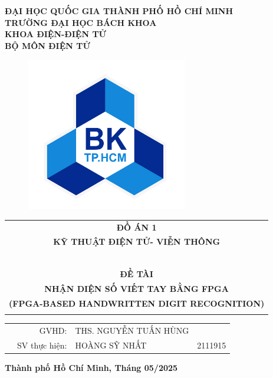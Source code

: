\documentclass[a4paper]{article}
\numberwithin{figure}{section}
\begin{document}
\large
\begin{titlepage}
\begin{center}
\textbf{\large ĐẠI HỌC QUỐC GIA THÀNH PHỐ HỒ CHÍ MINH} \\
\textbf{\large TRƯỜNG ĐẠI HỌC BÁCH KHOA} \\
\textbf{\large KHOA ĐIỆN-ĐIỆN TỬ} \\
\textbf{\large BỘ MÔN ĐIỆN TỬ} \\
\end{center}
\begin{figure}[h!]
\begin{center}
\includegraphics[width=7cm]{Images/hcmut.png}
\end{center}
\end{figure}

\vspace{1cm}
\begin{center}
\begin{tabular}{c}
{\textbf{{\Large ĐỒ ÁN 1}}}\\
{\textbf{{\Large KỸ THUẬT ĐIỆN TỬ- VIỄN THÔNG}}}\\
~~\\
\hline
\\
\textbf{\large ĐỀ TÀI} \\
\textbf{\LARGE NHẬN DIỆN SỐ VIẾT TAY BẰNG FPGA} \\
\textbf{\large (FPGA-BASED HANDWRITTEN DIGIT RECOGNITION)} \\
\\
\hline
\end{tabular}
\end{center}

\vspace{1cm}

\begin{table}[h]
\begin{tabular}{rrlr}
\hspace{5 cm} & \large GVHD: & \large THS. NGUYỄN TUẤN HÙNG\\

& \large SV thực hiện: &\large HOÀNG SỸ NHẤT & 2111915\\

\end{tabular}
\end{table}
\vspace{1.5cm}
\begin{center}
{\bf Thành phố Hồ Chí Minh, Tháng 05/2025}
\end{center}
\end{titlepage}
\end{document}
